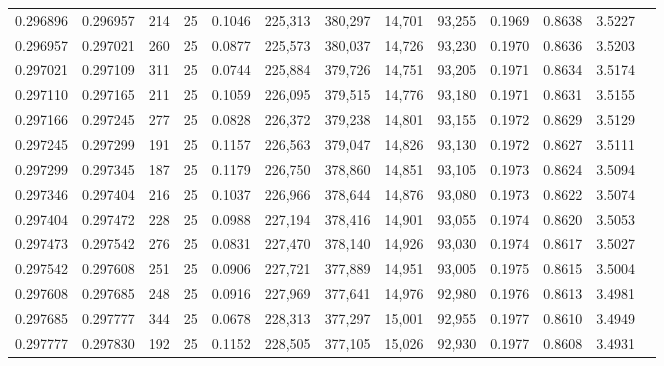 \begin{tabular}{rrrrrrrrrrrrr}
0.296896 & 0.296957 &   214 &  25 &                                     0.1046 & 225,313 & 380,297 &  14,701 &  93,255 & 0.1969 & 0.8638 & 3.5227 \\
0.296957 & 0.297021 &   260 &  25 &                                     0.0877 & 225,573 & 380,037 &  14,726 &  93,230 & 0.1970 & 0.8636 & 3.5203 \\
0.297021 & 0.297109 &   311 &  25 &                                     0.0744 & 225,884 & 379,726 &  14,751 &  93,205 & 0.1971 & 0.8634 & 3.5174 \\
0.297110 & 0.297165 &   211 &  25 &                                     0.1059 & 226,095 & 379,515 &  14,776 &  93,180 & 0.1971 & 0.8631 & 3.5155 \\
0.297166 & 0.297245 &   277 &  25 &                                     0.0828 & 226,372 & 379,238 &  14,801 &  93,155 & 0.1972 & 0.8629 & 3.5129 \\
0.297245 & 0.297299 &   191 &  25 &                                     0.1157 & 226,563 & 379,047 &  14,826 &  93,130 & 0.1972 & 0.8627 & 3.5111 \\
0.297299 & 0.297345 &   187 &  25 &                                     0.1179 & 226,750 & 378,860 &  14,851 &  93,105 & 0.1973 & 0.8624 & 3.5094 \\
0.297346 & 0.297404 &   216 &  25 &                                     0.1037 & 226,966 & 378,644 &  14,876 &  93,080 & 0.1973 & 0.8622 & 3.5074 \\
0.297404 & 0.297472 &   228 &  25 &                                     0.0988 & 227,194 & 378,416 &  14,901 &  93,055 & 0.1974 & 0.8620 & 3.5053 \\
0.297473 & 0.297542 &   276 &  25 &                                     0.0831 & 227,470 & 378,140 &  14,926 &  93,030 & 0.1974 & 0.8617 & 3.5027 \\
0.297542 & 0.297608 &   251 &  25 &                                     0.0906 & 227,721 & 377,889 &  14,951 &  93,005 & 0.1975 & 0.8615 & 3.5004 \\
0.297608 & 0.297685 &   248 &  25 &                                     0.0916 & 227,969 & 377,641 &  14,976 &  92,980 & 0.1976 & 0.8613 & 3.4981 \\
0.297685 & 0.297777 &   344 &  25 &                                     0.0678 & 228,313 & 377,297 &  15,001 &  92,955 & 0.1977 & 0.8610 & 3.4949 \\
0.297777 & 0.297830 &   192 &  25 &                                     0.1152 & 228,505 & 377,105 &  15,026 &  92,930 & 0.1977 & 0.8608 & 3.4931 \\

\end{tabular}
